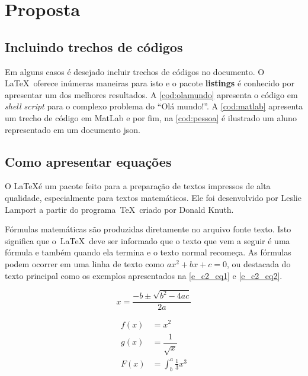 \chapter{Proposta}\label{cap:proposta}


\section{Incluindo trechos de códigos}\label{sec:codigos}

Em alguns casos é desejado incluir trechos de códigos no documento. O \LaTeX~oferece inúmeras maneiras para isto e o pacote \textbf{listings} é conhecido por apresentar um dos melhores resultados. A \autoref{cod:olamundo} apresenta o código em \textit{shell script} para o complexo problema do ``Olá mundo!''. A \autoref{cod:matlab} apresenta um trecho de código em MatLab e por fim, na \autoref{cod:pessoa} é ilustrado um aluno representado em um documento \gls{json}.








\section{Como apresentar equações}\label{sec:equacoes}

O \LaTeX é um pacote feito para a preparação de textos impressos de alta qualidade, especialmente
para textos matemáticos. Ele foi desenvolvido por Leslie Lamport a partir do programa~\TeX~criado por Donald Knuth.

Fórmulas matemáticas são produzidas diretamente no arquivo fonte texto. Isto significa que o~\LaTeX~deve ser informado que o texto que vem a seguir é uma fórmula e também quando ela termina e o texto normal recomeça. As fórmulas podem ocorrer em uma linha de texto como $ ax^2 + bx + c = 0 $, ou destacada do texto principal como os exemplos apresentados na \autoref{e_c2_eq1} e \autoref{e_c2_eq2}.

\begin{equation}
 x=\frac{-b\pm\sqrt{b^2-4ac}}{2a}
\label{e_c2_eq1}
\end{equation}

\begin{align}
f(x) &= x^2 \nonumber\\
g(x) &= \dfrac{1}{\sqrt{x}} \nonumber\\
F(x) &= \int^a_b \frac{1}{3}x^3
\label{e_c2_eq2}
\end{align}

